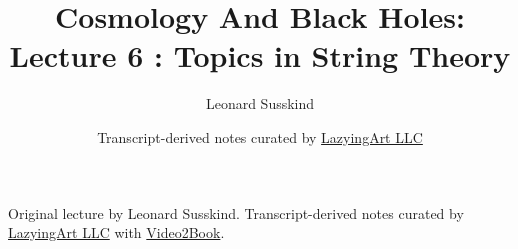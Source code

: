 \documentclass[11pt,oneside]{book}
\begin{document}
\frontmatter
\title{Cosmology And Black Holes: Lecture 6 : Topics in String Theory}
\author{Leonard Susskind}
\date{Transcript-derived notes curated by \href{https://lazying.art}{LazyingArt LLC}}
\maketitle
\begin{center}
\small Original lecture by Leonard Susskind. Transcript-derived notes curated by \href{https://lazying.art}{LazyingArt LLC} with \href{https://github.com/lachlanchen/Video2Book}{Video2Book}.
\end{center}
\clearpage
\mainmatter

\end{document}
